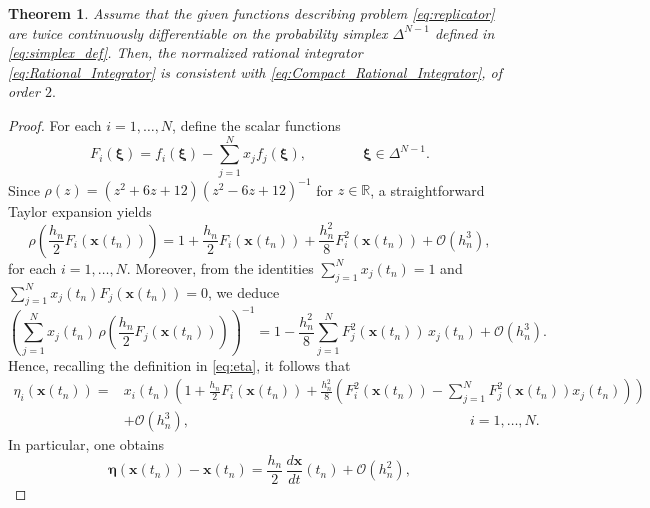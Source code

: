 \documentclass[11pt,letterpaper]{article}
\newtheorem{theorem}{Theorem}[section]
\theoremstyle{remark}
\begin{document}
\begin{theorem}\label{thm:Consistency}
    Assume that the given functions describing problem \eqref{eq:replicator} are twice continuously differentiable on the probability simplex $\Delta^{N-1}$ defined in \eqref{eq:simplex_def}. Then, the normalized rational integrator \eqref{eq:Rational_Integrator} is consistent with \eqref{eq:Compact_Rational_Integrator}, of order $2.$
\end{theorem}
\begin{proof}
    For each \( i = 1, \dots, N \), define the scalar functions
    \begin{equation}\label{eq:F_defn}
        F_i(\bm{\xi}) = f_i(\bm{\xi}) - \textstyle\sum_{j=1}^N x_j f_j(\bm{\xi}), \qquad \qquad \bm{\xi}\in\Delta^{N-1}.
    \end{equation}
    Since $\rho(z) = (z^2 + 6z + 12)(z^2 - 6z + 12)^{-1}$ for $z \in \mathbb{R}$, a straightforward Taylor expansion yields
    \begin{equation*}
        \rho\left( \frac{h_n}{2} F_i(\bm{x}(t_n)) \right) = 1 + \frac{h_n}{2} F_i(\bm{x}(t_n)) + \frac{h_n^2}{8} F_i^2(\bm{x}(t_n)) + \mathcal{O}(h_n^3),
    \end{equation*}
    for each $i=1,\dots,N.$ Moreover, from the identities \( \sum_{j=1}^N x_j(t_n) = 1 \) and \( \sum_{j=1}^N x_j(t_n) F_j(\bm{x}(t_n)) = 0 \), we deduce
        \begin{equation*}
        \left( \sum_{j=1}^N x_j(t_n) \, \rho\left( \frac{h_n}{2} F_j(\bm{x}(t_n)) \right) \right)^{-1} = 1 - \frac{h_n^2}{8} \sum_{j=1}^N F_j^2(\bm{x}(t_n)) \, x_j(t_n) + \mathcal{O}(h_n^3).
        \end{equation*}
    Hence, recalling the definition in \eqref{eq:eta}, it follows that
    \begin{equation}\label{eq:temp_1}
        \begin{split}
            \eta_i(\bm{x}(t_n))=&x_i(t_{n}) \left(1+\frac{h_n}{2}F_i(\bm{x}(t_n))+\frac{h_n^2}{8}\left(F_i^2(\bm{x}(t_{n}))-\sum_{j=1}^NF_j^2(\bm{x}(t_{n}))x_j(t_n) \right)\right)\\
            &+\mathcal{O}(h_n^3), \qquad \qquad \qquad \qquad \qquad \qquad\qquad \qquad \qquad \qquad i=1,\dots,N.
        \end{split}
    \end{equation}
    In particular, one obtains
        \begin{equation*}
        \bm{\eta}(\bm{x}(t_n))-\bm{x}(t_n) = \frac{h_n}{2} \, \dfrac{d \bm{x}}{d t}(t_n) + \mathcal{O}(h_n^2),
        \end{equation*}

\end{proof}
\end{document}
